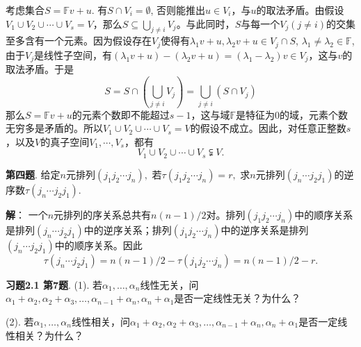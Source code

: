 考虑集合$S = \mathbb{F}v + u$. 有$S\cap V_i=\emptyset$, 否则能推出$u\in V_i$，与$u$的取法矛盾。由假设$V_1\cup V_2\cup \cdots \cup V_s = V$，那么$S\subseteq \bigcup\limits_{j\neq i} V_j$。与此同时，$S$与每一个$V_j (j\neq i)$的交集至多含有一个元素。因为假设存在$V_j$使得有$\lambda_1v+u, \lambda_2v+u \in V_j\cap S$, $\lambda_1\neq\lambda_2 \in \mathbb{F}$, 由于$V_j$是线性子空间，有$(\lambda_1v+u) - (\lambda_2v+u) = (\lambda_1 - \lambda_2)v \in V_j$，这与$v$的取法矛盾。于是
$$S = S\cap (\bigcup\limits_{j\neq i} V_j) = \bigcup\limits_{j\neq i} (S \cap V_j)$$
那么$S = \mathbb{F}v + u$的元素个数即不能超过$s-1$，这与域$\mathbb{F}$是特征为0的域，元素个数无穷多是矛盾的。所以$V_1\cup V_2\cup \cdots \cup V_s = V$的假设不成立。因此，对任意正整数$s$，以及$V$的真子空间$V_1,\cdots,V_s$，都有
$$V_1\cup V_2\cup \cdots \cup V_s \subsetneqq V.$$

\newpageorvspace

{\bf 第四题}. 给定$n$元排列$(j_1j_2\cdots j_n),$ 若$\tau(j_1j_2\cdots j_n) = r,$ 求$n$元排列$(j_n\cdots j_2j_1)$的逆序数$\tau(j_n\cdots j_2j_1)$.

\newpageorvspace

{\bf 解}： 一个$n$元排列的序关系总共有$n(n-1)/2$对。排列$(j_1j_2\cdots j_n)$中的顺序关系是排列$(j_n\cdots j_2j_1)$中的逆序关系；排列$(j_1j_2\cdots j_n)$中的逆序关系是排列$(j_n\cdots j_2j_1)$中的顺序关系。因此
$$\tau(j_n\cdots j_2j_1) = n(n-1)/2 - \tau(j_1j_2\cdots j_n) = n(n-1)/2 - r.$$

\newpageorvspace

{\bf 习题2.1 第7题}. (1). 若$\alpha_1, \ldots, \alpha_n$线性无关，问$\alpha_1 + \alpha_2, \alpha_2 + \alpha_3, \ldots, \alpha_{n-1} + \alpha_n, \alpha_n + \alpha_1$是否一定线性无关？为什么？

(2). 若$\alpha_1, \ldots, \alpha_n$线性相关，问$\alpha_1 + \alpha_2, \alpha_2 + \alpha_3, \ldots, \alpha_{n-1} + \alpha_n, \alpha_n + \alpha_1$是否一定线性相关？为什么？

\newpageorvspace

